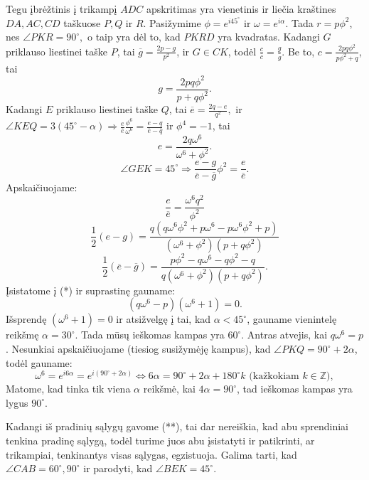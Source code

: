 \documentclass[11pt,a4paper,twoside]{book}
\begin{document}
\begin{sprendimas}
Tegu įbrėžtinis į trikampį $ADC$ apskritimas yra vienetinis ir liečia kraštines $DA, AC, CD$  taškuose $P, Q$ ir $R$. Pasižymime $\phi=e^{i45^{\circ}}$ ir $\omega=e^{i\alpha}$. Tada $r=p\phi^2$, nes $\angle PKR=90^{\circ},$ o taip yra dėl to, kad $PKRD$ yra kvadratas.
Kadangi $G$ priklauso liestinei taške $P$, tai $\overline{g}=\frac{2p-g}{p^2}$, ir $G\in CK$, todėl $\frac{c}{\overline{c}}=\frac{g}{\overline{g}}$. Be to, $c=\frac{2pq\phi^2}{p\phi^2+q}$, tai
$$g=\frac{2pq\phi ^2}{p+q\phi^2}.$$
Kadangi $E$ priklauso liestinei taške $Q$, tai $\overline{e}=\frac{2q-e}{q^2},$ ir $\angle KEQ=3(45^{\circ}-\alpha) \Rightarrow  \frac{e}{\overline{e}}\frac{\phi^6}{\omega^6}= \frac{e-q}{\overline{e}-\overline{q}}$ ir $\phi^4=-1$, tai
$$e=\frac{2q\omega^6}{\omega^6 +\phi ^2}.$$
\begin{equation*}
\angle GEK = 45^{\circ} \Rightarrow \frac{e-g}{\overline{e}-\overline{g}}\phi^2=\frac{e}{\overline{e}}.\tag{*}
\end{equation*}
Apskaičiuojame:
$$\frac{e}{\overline{e}}= \frac{\omega^6q^2}{\phi^2}$$
$$\frac{1}{2}(e-g)=\frac{q(q\omega^6\phi^2 +p\omega^6 -p\omega^6\phi^2 +p)}{(\omega^6+\phi^2)(p +q\phi^2)}$$
$$\frac{1}{2}(\overline{e}-\overline{g})=\frac{p\phi^2 -q\omega^6 -q\phi^2 - q}{q(\omega^6+\phi^2)(p +q\phi^2)}.$$
Įsistatome į (*) ir suprastinę gauname:
\begin{equation*}
(q\omega^6 -p)(\omega^6+1)=0. \tag{**}
\end{equation*}
Išsprendę $(\omega^6+1)=0$ ir atsižvelgę į tai, kad $ \alpha < 45^{\circ}$, gauname vienintelę reikšmę $\alpha = 30^{\circ}$. Tada mūsų ieškomas kampas yra $60^{\circ}$.
Antras atvejis, kai $q\omega^6 =p$. Nesunkiai apskaičiuojame (tiesiog susižymėję kampus), kad $\angle PKQ=90^{\circ} +2\alpha$, todėl gauname:
\begin{equation*}
\omega^6=e^{i6\alpha}=e^{i(90^{\circ} +2\alpha)} \Leftrightarrow 6\alpha=90^{\circ} +2\alpha +180^{\circ}k \text{ (kažkokiam } k\in \mathbb{Z}),
\end{equation*}
Matome, kad tinka tik viena $\alpha$ reikšmė, kai $4\alpha=90^{\circ}$, tad ieškomas kampas yra lygus $90^{\circ}$.

Kadangi iš pradinių sąlygų gavome (**), tai dar nereiškia, kad abu sprendiniai tenkina pradinę sąlygą, todėl turime juos abu įsistatyti ir patikrinti, ar trikampiai, tenkinantys visas sąlygas, egzistuoja. Galima tarti, kad $\angle CAB= 60^{\circ},90^{\circ}$ ir parodyti, kad $\angle BEK =45^{\circ}$.
\end{sprendimas}
\end{document}
